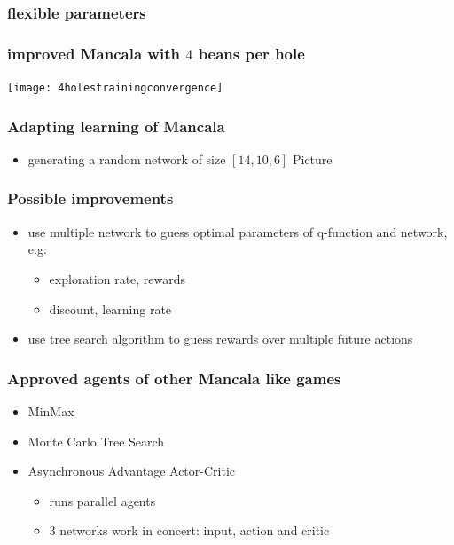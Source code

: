 \documentclass{beamer}
\begin{document}
\begin{frame}
\frametitle{flexible parameters}

\end{frame}

 \begin{frame}
\frametitle{improved Mancala with $4$ beans per hole}
 \texttt{[image: 4holestrainingconvergence]}
 \end{frame}

\begin{frame} 
\frametitle{Adapting learning of Mancala}
\begin{itemize}
\item generating a random network of size $[14,10,6]$
Picture
\end{itemize}
\end{frame}
\begin{frame}
\frametitle{Possible improvements}
\begin{itemize}
\item use multiple network to guess optimal parameters of q-function and network, e.g:
\begin{itemize}
\item exploration rate, rewards
\item discount, learning rate
\end{itemize}
\item use tree search algorithm to guess rewards over multiple future actions
\end{itemize}
\end{frame}
\begin{frame}
\frametitle{Approved agents of other Mancala like games}
\begin{itemize}
\item MinMax
\item Monte Carlo Tree Search
\item Asynchronous Advantage Actor-Critic
\begin{itemize}
\item runs parallel agents
\item 3 networks work in concert: input, action and critic
\end{itemize}
\end{itemize}
\end{frame}
\end{document}
